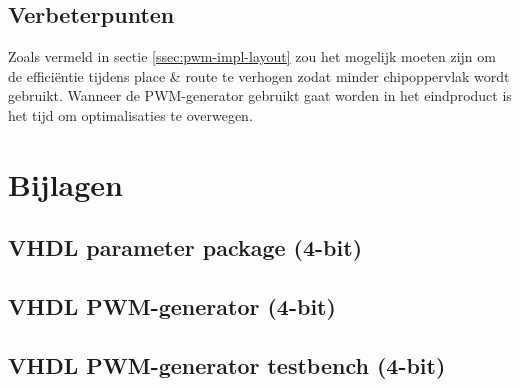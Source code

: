 \documentclass{article}
\begin{document}
\subsection{Verbeterpunten}
\label{ssec:pwm-conclusie-verb}
Zoals vermeld in sectie \ref{ssec:pwm-impl-layout} zou het mogelijk moeten zijn om de efficiëntie tijdens place \& route te verhogen zodat minder chipoppervlak wordt gebruikt. Wanneer de PWM-generator gebruikt gaat worden in het eindproduct is het tijd om optimalisaties te overwegen.

\section{Bijlagen}
\label{sec:pwm-bijlagen}

\subsection{VHDL parameter package (4-bit)}
\label{lst:pwm-gen-pack}

\subsection{VHDL PWM-generator (4-bit)}
\label{lst:pwm-gen}

\subsection{VHDL PWM-generator testbench (4-bit)}
\label{lst:pwm-gen-tb}
\end{document}
